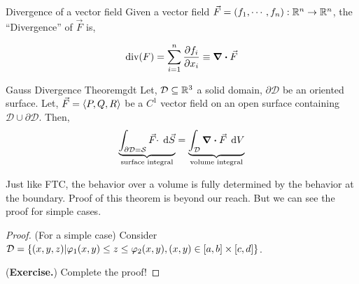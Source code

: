 \documentclass[../Analysis-3]{subfiles}
\begin{document}
\begin{Def}{Divergence of a vector field}{}
    \small  Given a vector field $\vec{F} = (f_1,\cdots, f_n) : \mathbb{R}^n \to \mathbb{R}^n $, the ``Divergence'' of $\vec{F}$ is,

    \[\text{div}(F) = \sum_{i=1}^{n} \pdv{f_i}{x_i} \equiv \div \vec{F}\]
\end{Def}

\begin{Thm}{Gauss Divergence Theorem}{gdt}
    Let, $\mathcal{D} \subseteq \mathbb{R}^3$ a solid domain, $\partial{\mathcal{D}}$ be an oriented surface. Let,  $\vec{F} = \left\langle {P}, {Q,R} \right\rangle$ be a $C^1$ vector field on an open surface containing $\mathcal{D} \cup \partial{\mathcal{D}}$. Then,
    \[
        \underbrace{\int_{\partial{\mathcal{D}} = \mathcal{S}} {\vec{F}\cdot} \hspace{0.1cm} \dd {\vec{S}}}_\text{surface integral} = \underbrace{\int_{\mathcal{D}} {\div \vec{F}} \hspace{0.1cm} \dd {V}}_\text{volume integral}
    \]
\end{Thm}

Just like FTC, the behavior over a volume is fully determined by the behavior at the boundary. Proof of this theorem is beyond our reach. But we can see the proof for simple cases.

\vspace{0.2cm}

\begin{proof}
    (For a simple case) Consider $\mathcal{D} = \qty{(x,y,z) | \varphi_1(x,y) \le z \le \varphi_2(x,y), (x,y) \in [a,b]\times [c,d]}$.

    (\textbf{Exercise.}) Complete the proof!
\end{proof}

\end{document}
